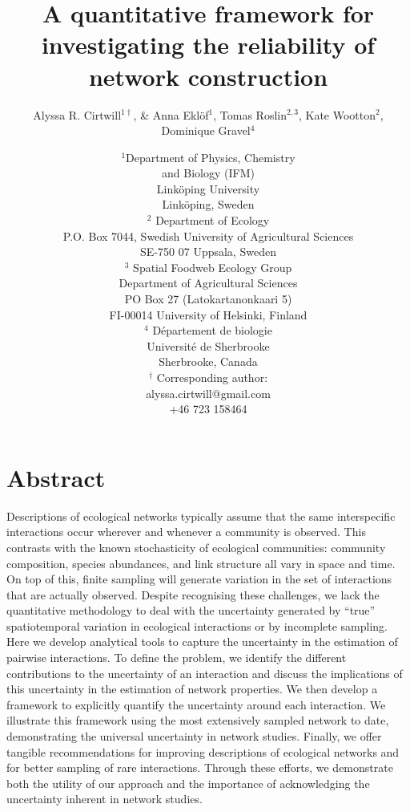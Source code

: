 \documentclass[12pt]{article}
\title{A quantitative framework for investigating the reliability of network construction}
\author{Alyssa R. Cirtwill$^{1\dagger}$, \&  Anna Ekl\"{o}f$^{1}$, Tomas Roslin$^{2,3}$, Kate Wootton$^{2}$, Dominique Gravel$^{4}$}
\date{\small$^1$Department of Physics, Chemistry\\ 
and Biology (IFM)\\ 
Link\"{o}ping University\\
Link\"{o}ping, Sweden\\
\medskip $^2$ Department of Ecology\\ P.O. Box 7044, Swedish University of Agricultural Sciences \\ SE-750 07 Uppsala, Sweden \\
\medskip $^3$ Spatial Foodweb Ecology Group\\ Department of Agricultural Sciences \\ PO Box 27 (Latokartanonkaari 5)\\ FI-00014 University of Helsinki, Finland \\
\medskip$^4$ D\'{e}partement de biologie\\ 
Universit\'{e} de Sherbrooke\\ 
Sherbrooke, Canada\\ 
\medskip
$^\dagger$ Corresponding author:\\
alyssa.cirtwill@gmail.com\\
+46 723 158464\\
}
\begin{document}
 
\maketitle 
\raggedright
\setlength{\parindent}{15pt} 

\clearpage

\section*{Abstract}

  Descriptions of ecological networks typically assume that the same interspecific interactions occur wherever and whenever a community is observed. This contrasts with the known stochasticity of ecological communities: community composition, species abundances, and link structure all vary in space and time. On top of this, finite sampling will generate variation in the set of interactions that are actually observed. Despite recognising these challenges, we lack the quantitative methodology to deal with the uncertainty generated by “true” spatiotemporal variation in ecological interactions or by incomplete sampling. Here we develop analytical tools to capture the uncertainty in the estimation of pairwise interactions. To define the problem, we identify the different contributions to the uncertainty of an interaction and discuss the implications of this uncertainty in the estimation of network properties. We then develop a framework to explicitly quantify the uncertainty around each interaction. We illustrate this framework using the most extensively sampled network to date, demonstrating the universal uncertainty in network studies. Finally, we offer tangible recommendations for improving descriptions of ecological networks and for better sampling of rare interactions. Through these efforts, we demonstrate both the utility of our approach and the importance of acknowledging the uncertainty inherent in network studies.


\end{document}
